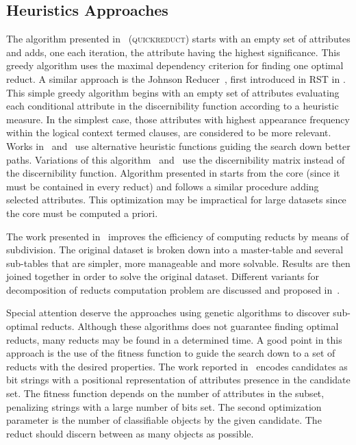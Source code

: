 \documentclass[11pt]{article}   %
\begin{document}
\subsection{Heuristics Approaches}
  The algorithm presented in~\cite{Chouchoulas01} (\textsc{quickreduct}) starts with an empty set of 
  attributes and adds, one each iteration, the attribute having the highest significance. This greedy algorithm 
  uses the maximal dependency criterion for finding one optimal reduct.  
  A similar approach is the Johnson Reducer~\cite{Johnson74}, first introduced in RST in \cite{Ohrn00}.
  This simple greedy algorithm begins with an empty set of attributes evaluating each conditional attribute in the
  discernibility function according to a heuristic measure. In the simplest case, those attributes with highest 
  appearance frequency within the logical context termed clauses, are considered to be more relevant. Works 
  in~\cite{Nguyen97} and~\cite{Wang01} use alternative heuristic functions guiding the search down better paths. 
  Variations of this algorithm~\cite{Wang01} and~\cite{Yang08} use the discernibility matrix instead of the
  discernibility function.
  Algorithm presented in \cite{Zhong01} starts from the core (since it must be contained in every reduct) and
  follows a similar procedure adding selected attributes. This optimization may be impractical for large datasets
  \cite{Jensen14} since the core must be computed a priori.
  
  The work presented in~\cite{Jiao10} improves the efficiency of computing reducts by means of subdivision. The 
  original dataset is broken down into a master-table and several sub-tables that are simpler, more manageable 
  and more solvable. Results are then joined together in order to solve the original dataset. Different variants
  for decomposition of reducts computation problem are discussed and proposed in~\cite{Strakowski08}.
  
  Special attention deserve the approaches using genetic algorithms to discover sub-optimal reducts. Although 
  these algorithms does not guarantee finding optimal reducts, many reducts may be found in a determined time.
  A good point in this approach is the use of the fitness function to guide the search down to a set of 
  reducts with the desired properties. The work reported in~\cite{Wroblewski95} encodes candidates as bit 
  strings with a positional representation of attributes presence in the candidate set. The fitness function
  depends on the number of attributes in the subset, penalizing strings with a large number of bits set. The 
  second optimization parameter is the number of classifiable objects by the given candidate. The reduct should 
  discern between as many objects as possible.
  
\end{document}
